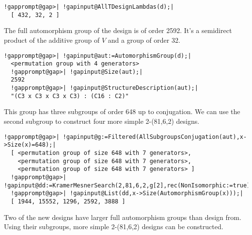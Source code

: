 \documentclass[a4paper,11pt]{report}
\begin{document}
{{{\begin{Verbatim}[commandchars=!@|,fontsize=\small,frame=single,label=Example]
  !gapprompt@gap>| !gapinput@AllTDesignLambdas(d);|
  [ 432, 32, 2 ]
\end{Verbatim}
 The full automorphism group of the design is of order 2592. It's a semidirect
product of the additive group of $V$ and a group of order 32. 
\begin{Verbatim}[commandchars=!@|,fontsize=\small,frame=single,label=Example]
  !gapprompt@gap>| !gapinput@aut:=AutomorphismGroup(d);|
  <permutation group with 4 generators>
  !gapprompt@gap>| !gapinput@Size(aut);|
  2592
  !gapprompt@gap>| !gapinput@StructureDescription(aut);|
  "(C3 x C3 x C3 x C3) : (C16 : C2)"
\end{Verbatim}
 This group has three subgroups of order 648 up to conjugation. We can use the
second subgroup to construct four more simple 2-(81,6,2) designs. 
\begin{Verbatim}[commandchars=!@|,fontsize=\small,frame=single,label=Example]
  !gapprompt@gap>| !gapinput@g:=Filtered(AllSubgroupsConjugation(aut),x->Size(x)=648);|
  [ <permutation group of size 648 with 7 generators>, 
    <permutation group of size 648 with 7 generators>, 
    <permutation group of size 648 with 7 generators> ]
  !gapprompt@gap>| !gapinput@dd:=KramerMesnerSearch(2,81,6,2,g[2],rec(NonIsomorphic:=true));;|
  !gapprompt@gap>| !gapinput@List(dd,x->Size(AutomorphismGroup(x)));|
  [ 1944, 15552, 1296, 2592, 3888 ]
\end{Verbatim}
 Two of the new designs have larger full automorphism groups than design
from{\nobreakspace}\cite{AN21}. Using their subgroups, more simple 2-(81,6,2) designs can be constructed. }

 
}}
\end{document}
